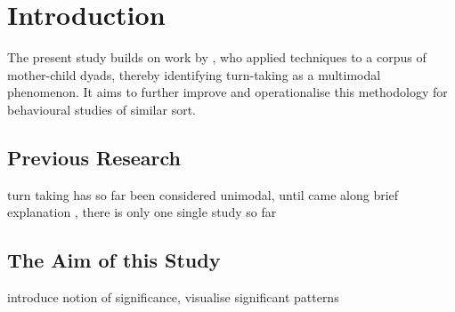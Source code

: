 
\chapter{Introduction}
The present study builds on work by , who applied \fpm{} techniques to a corpus of mother-child dyads, thereby identifying turn-taking as a multimodal phenomenon. It aims to further improve and operationalise this methodology for behavioural studies of similar sort.

\section{Previous Research}
turn taking has so far been considered unimodal, until  came along
brief explanation \fpm, there is only one single study so far

\section{The Aim of this Study}
introduce notion of significance, visualise significant patterns




